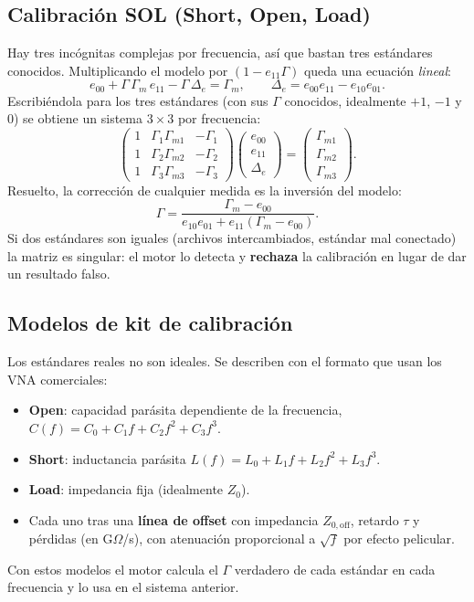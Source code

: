 \subsection{Calibración SOL (Short, Open, Load)}
Hay tres incógnitas complejas por frecuencia, así que bastan tres estándares conocidos. Multiplicando el modelo por $(1 - e_{11}\Gamma)$
queda una ecuación \emph{lineal}:
\begin{equation}
  e_{00} + \Gamma\,\Gamma_m\,e_{11} - \Gamma\,\Delta_e = \Gamma_m, \qquad \Delta_e = e_{00}e_{11} - e_{10}e_{01}.
\end{equation}
Escribiéndola para los tres estándares (con sus $\Gamma$ conocidos, idealmente $+1$, $-1$ y $0$) se obtiene un sistema $3\times3$ por frecuencia:
\begin{equation}
  \begin{pmatrix} 1 & \Gamma_1\Gamma_{m1} & -\Gamma_1 \\ 1 & \Gamma_2\Gamma_{m2} & -\Gamma_2 \\ 1 & \Gamma_3\Gamma_{m3} & -\Gamma_3 \end{pmatrix}
  \begin{pmatrix} e_{00} \\ e_{11} \\ \Delta_e \end{pmatrix} = \begin{pmatrix} \Gamma_{m1} \\ \Gamma_{m2} \\ \Gamma_{m3}\end{pmatrix}.
\end{equation}
Resuelto, la corrección de cualquier medida es la inversión del modelo:
\begin{equation}
  \Gamma = \frac{\Gamma_m - e_{00}}{e_{10}e_{01} + e_{11}(\Gamma_m - e_{00})}.
\end{equation}
Si dos estándares son iguales (archivos intercambiados, estándar mal conectado) la matriz es singular: el motor lo detecta y \textbf{rechaza} la
calibración en lugar de dar un resultado falso.

\subsection{Modelos de kit de calibración}
Los estándares reales no son ideales. Se describen con el formato que usan los VNA comerciales:
\begin{itemize}
\item \textbf{Open}: capacidad parásita dependiente de la frecuencia, $C(f) = C_0 + C_1 f + C_2 f^2 + C_3 f^3$.
\item \textbf{Short}: inductancia parásita $L(f) = L_0 + L_1 f + L_2 f^2 + L_3 f^3$.
\item \textbf{Load}: impedancia fija (idealmente $Z_0$).
\item Cada uno tras una \textbf{línea de offset} con impedancia $Z_{0,\text{off}}$, retardo $\tau$ y pérdidas (en G$\Omega$/s), con atenuación
proporcional a $\sqrt f$ por efecto pelicular.
\end{itemize}
Con estos modelos el motor calcula el $\Gamma$ verdadero de cada estándar en cada frecuencia y lo usa en el sistema anterior.

